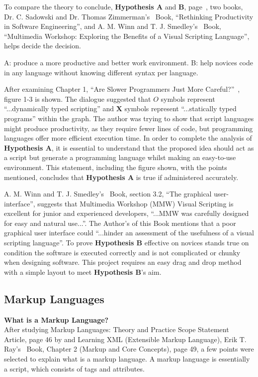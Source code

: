 \documentclass[conference]{IEEEtran}
\begin{document}
        To compare the theory to conclude, \textbf{Hypothesis A} and \textbf{B}, page~\pageref{abstract}, two books, Dr. C. Sadowski and Dr. Thomas Zimmerman's~\cite{dr_caitlin_sadowski_rethinking_2019} Book, ``Rethinking Productivity in Software Engineering'', and A. M. Winn and T. J. Smedley’s~\cite{winn_multimedia_1998} Book, ``Multimedia Workshop: Exploring the Benefits of a Visual Scripting Language'', helps decide the decision.

        \begin{center}
           A: produce a more productive and better work environment.
           B: help novices code in any language without knowing different syntax per language.
        \end{center}
        
        After examining Chapter 1, ``Are Slower Programmers Just More Careful?''~\cite{dr_caitlin_sadowski_rethinking_2019}, figure 1-3 is shown. The dialogue suggested that $O$ symbols represent ``...dynamically typed scripting'' and $\mathbf{X}$ symbols represent ``...statically typed programs'' within the graph. The author was trying to show that script languages might produce productivity, as they require fewer lines of code, but programming languages offer more efficient execution time. In order to complete the analysis of \textbf{Hypothesis A}, it is essential to understand that the proposed idea should act as a script but generate a programming language whilst making an easy-to-use environment. This statement, including the figure shown, with the points mentioned, concludes that \textbf{Hypothesis A} is true if administered accurately.

        A. M. Winn and T. J. Smedley’s~\cite{winn_multimedia_1998} Book, section 3.2, ``The graphical user-interface'',  suggests that Multimedia Workshop (MMW) Visual Scripting is excellent for junior and experienced developers, ``...MMW was carefully designed for easy and natural use...''. The Author’s of this Book mentions that a poor graphical user interface could ``...hinder an assessment of the usefulness of a visual scripting language''. To prove \textbf{Hypothesis B} effective on novices stands true on condition the software is executed correctly and is not complicated or chunky when designing software. This project requires an easy drag and drop method with a simple layout to meet \textbf{Hypothesis B}’s aim.

      \subsection{Markup Languages}
      \label{subsec:lr-markupLanguages}
        \textbf{What is a Markup Language?}\\
          After studying Markup Languages: Theory and Practice Scope Statement~\cite{noauthor_markup_1999} Article, page 46 by and Learning XML (Extensible Markup Language), Erik T. Ray's~\cite{ray_learning_nodate} Book, Chapter 2 (Markup and Core Concepts), page 49, a few points were selected to explain what is a markup language. A markup language is essentially a script, which consists of tags and attributes. 
\end{document}
